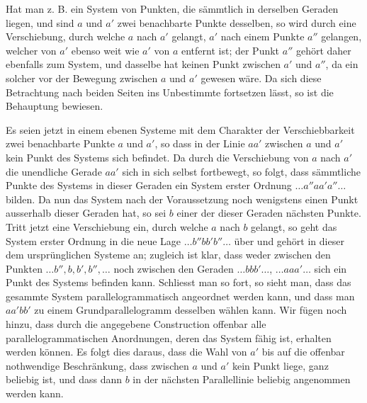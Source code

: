 \documentclass[11pt]{article}
\begin{document}
Hat man z. B. ein System von Punkten, die sämmtlich in derselben Geraden liegen, und sind $a$ und $a'$ zwei benachbarte Punkte desselben, so wird durch eine Verschiebung, durch welche $a$ nach $a'$ gelangt, $a'$ nach einem Punkte $a''$ gelangen, welcher von $a'$ ebenso weit wie $a'$ von $a$ entfernt ist; der Punkt $a''$ gehört daher ebenfalls zum System, und dasselbe hat keinen Punkt zwischen $a'$ und $a''$, da ein solcher vor der Bewegung zwischen $a$ und $a'$ gewesen wäre. Da sich diese Betrachtung nach beiden Seiten ins Unbestimmte fortsetzen lässt, so ist die Behauptung bewiesen.

Es seien jetzt in einem ebenen Systeme mit dem Charakter der Verschiebbarkeit zwei benachbarte Punkte $a$ und $a'$, so dass in der Linie $aa'$ zwischen $a$ und $a'$ kein Punkt des Systems sich befindet. Da durch die Verschiebung von $a$ nach $a'$ die unendliche Gerade $aa'$ sich in sich selbst fortbewegt, so folgt, dass sämmtliche Punkte des Systems in dieser Geraden ein System erster Ordnung $\ldots a''aa'a''\ldots$ bilden. Da nun das System nach der Voraussetzung noch wenigstens einen Punkt ausserhalb dieser Geraden hat, so sei $b$ einer der dieser Geraden nächsten Punkte. Tritt jetzt eine Verschiebung ein, durch welche $a$ nach $b$ gelangt, so geht das System erster Ordnung in die neue Lage $\ldots b''bb'b''\ldots$ über und gehört in dieser dem ursprünglichen Systeme an; zugleich ist klar, dass weder zwischen den Punkten $\ldots b'',b,b',b'',\ldots$ noch zwischen den Geraden $\ldots bbb'\ldots$, $\ldots aaa'\ldots$ sich ein Punkt des Systems befinden kann. Schliesst man so fort, so sieht man, dass das gesammte System parallelogrammatisch angeordnet werden kann, und dass man $aa'bb'$ zu einem Grundparallelogramm desselben wählen kann. Wir fügen noch hinzu, dass durch die angegebene Construction offenbar alle parallelogrammatischen Anordnungen, deren das System fähig ist, erhalten werden können. Es folgt dies daraus, dass die Wahl von $a'$ bis auf die offenbar nothwendige Beschränkung, dass zwischen $a$ und $a'$ kein Punkt liege, ganz beliebig ist, und dass dann $b$ in der nächsten Parallellinie beliebig angenommen werden kann.
\end{document}
